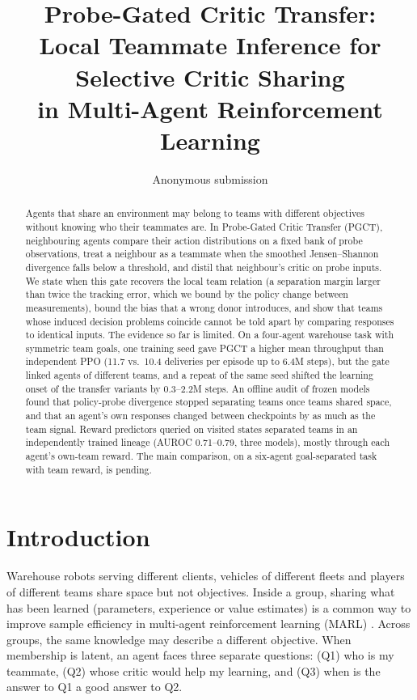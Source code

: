\documentclass{article}
\title{Probe-Gated Critic Transfer:\\ Local Teammate Inference for Selective Critic Sharing\\ in Multi-Agent Reinforcement Learning}
\author{Anonymous submission}
\theoremstyle{remark}
\newcommand{\ours}{PGCT}
\begin{document}
\maketitle

\begin{abstract}
Agents that share an environment may belong to teams with different objectives without knowing who their teammates
are. In Probe-Gated Critic Transfer (\ours{}), neighbouring agents compare their action distributions on a fixed bank of
probe observations, treat a neighbour as a teammate when the smoothed Jensen--Shannon divergence falls below a threshold,
and distil that neighbour's critic on probe inputs. We state when this gate recovers the local team relation (a
separation margin larger than twice the tracking error, which we bound by the policy change between measurements), bound
the bias that a wrong donor introduces, and show that teams whose induced decision problems coincide cannot be told apart
by comparing responses to identical inputs. The evidence so far is limited. On a four-agent warehouse task with symmetric
team goals, one training seed gave \ours{} a higher mean throughput than independent PPO (11.7 vs.\ 10.4 deliveries per
episode up to 6.4M steps), but the gate linked agents of different teams, and a repeat of the same seed shifted the
learning onset of the transfer variants by 0.3--2.2M steps. An offline audit of frozen models found that policy-probe
divergence stopped separating teams once teams shared space, and that an agent's own responses changed between checkpoints
by as much as the team signal. Reward predictors queried on visited states separated teams in an independently trained
lineage (AUROC 0.71--0.79, three models), mostly through each agent's own-team reward. The main comparison, on a six-agent
goal-separated task with team reward, is pending.
\end{abstract}

\section{Introduction}
Warehouse robots serving different clients, vehicles of different fleets and players of different teams share space but
not objectives. Inside a group, sharing what has been learned (parameters, experience or value estimates) is a common way
to improve sample efficiency in multi-agent reinforcement learning (MARL) \cite{christianos2020seac,christianos2021seps}.
Across groups, the same knowledge may describe a different objective. When membership is latent, an agent faces three
separate questions: (Q1) who is my teammate, (Q2) whose critic would help my learning, and (Q3) when is the answer to Q1 a
good answer to Q2.
\end{document}
